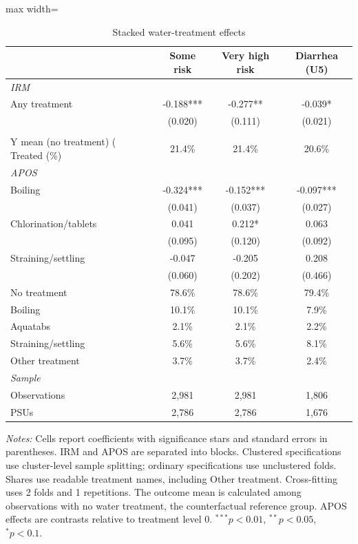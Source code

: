 \begin{table}[htbp]
\centering
\caption{Stacked water-treatment effects}
\label{tab:water-treatment-main}
\scriptsize
\setlength{\tabcolsep}{4pt}
\renewcommand{\arraystretch}{0.92}
\begin{adjustbox}{max width=\linewidth}
\begin{tabular}{lccc}
\hline\hline
 & Some risk & Very high risk & Diarrhea (U5) \\
\hline
\multicolumn{4}{l}{\textit{IRM}} \\
Any treatment & -0.188*** & -0.277** & -0.039* \\
 & (0.020) & (0.111) & (0.021) \\
\addlinespace[6pt]
\multicolumn{4}{l}{\textit{Shares}} \\
Y mean (no treatment) (%
Treated (\%) & 21.4\% & 21.4\% & 20.6\% \\
\midrule
\multicolumn{4}{l}{\textit{APOS}} \\
Boiling & -0.324*** & -0.152*** & -0.097*** \\
 & (0.041) & (0.037) & (0.027) \\
Chlorination/tablets & 0.041 & 0.212* & 0.063 \\
 & (0.095) & (0.120) & (0.092) \\
Straining/settling & -0.047 & -0.205 & 0.208 \\
 & (0.060) & (0.202) & (0.466) \\
\addlinespace[6pt]
No treatment & 78.6\% & 78.6\% & 79.4\% \\
Boiling & 10.1\% & 10.1\% & 7.9\% \\
Aquatabs & 2.1\% & 2.1\% & 2.2\% \\
Straining/settling & 5.6\% & 5.6\% & 8.1\% \\
Other treatment & 3.7\% & 3.7\% & 2.4\% \\
\midrule
\multicolumn{4}{l}{\textit{Sample}} \\
Observations & 2,981 & 2,981 & 1,806 \\
PSUs & 2,786 & 2,786 & 1,676 \\
\hline\hline
\end{tabular}
\end{adjustbox}
\par\vspace{3pt}
\begin{minipage}{\linewidth}\scriptsize \textit{Notes:} Cells report coefficients with significance stars and standard errors in parentheses. IRM and APOS are separated into blocks. Clustered specifications use cluster-level sample splitting; ordinary specifications use unclustered folds. Shares use readable treatment names, including Other treatment. Cross-fitting uses 2 folds and 1 repetitions. The outcome mean is calculated among observations with no water treatment, the counterfactual reference group. APOS effects are contrasts relative to treatment level 0. $^{***}p<0.01$, $^{**}p<0.05$, $^{*}p<0.1$.\end{minipage}
\end{table}